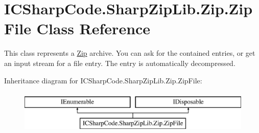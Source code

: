 \hypertarget{class_i_c_sharp_code_1_1_sharp_zip_lib_1_1_zip_1_1_zip_file}{}\section{I\+C\+Sharp\+Code.\+Sharp\+Zip\+Lib.\+Zip.\+Zip\+File Class Reference}
\label{class_i_c_sharp_code_1_1_sharp_zip_lib_1_1_zip_1_1_zip_file}


This class represents a \hyperlink{namespace_i_c_sharp_code_1_1_sharp_zip_lib_1_1_zip}{Zip} archive. You can ask for the contained entries, or get an input stream for a file entry. The entry is automatically decompressed.  


Inheritance diagram for I\+C\+Sharp\+Code.\+Sharp\+Zip\+Lib.\+Zip.\+Zip\+File\+:\begin{figure}[H]
\begin{center}
\leavevmode
\includegraphics[height=2.000000cm]{class_i_c_sharp_code_1_1_sharp_zip_lib_1_1_zip_1_1_zip_file}
\end{center}
\end{figure}
